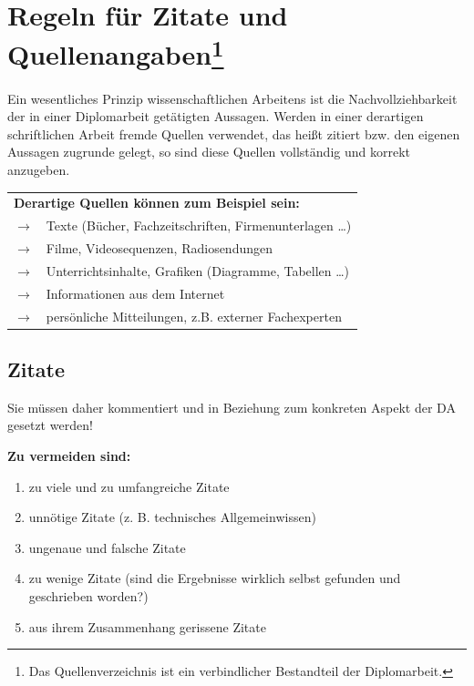 \documentclass[a4paper, 12pt, xcolor=dvipsnames]{scrartcl}		%
\begin{document}
\section{Regeln für Zitate und Quellenangaben\protect\footnote{Das Quellenverzeichnis ist ein verbindlicher Bestandteil der Diplomarbeit.}}
Ein wesentliches Prinzip wissenschaftlichen Arbeitens ist die Nachvollziehbarkeit der in einer Diplomarbeit
getätigten Aussagen. Werden in einer derartigen schriftlichen Arbeit fremde Quellen verwendet, das heißt zitiert bzw. den eigenen Aussagen zugrunde gelegt, so sind diese Quellen vollständig und korrekt anzugeben.\\

{\begin{tabular}{p{1.0cm}p{12.0cm}}
\multicolumn{2}{p{13.0cm}}{\textbf{Derartige Quellen können zum Beispiel sein:}} \\ 
\textcolor{black!80} {\large\textbf{$\to$}}  & Texte (Bücher, Fachzeitschriften, Firmenunterlagen \dots) \\ 
\textcolor{black!80} {\large\textbf{$\to$}}  & Filme, Videosequenzen, Radiosendungen \\
\textcolor{black!80} {\large\textbf{$\to$}}  & Unterrichtsinhalte, Grafiken (Diagramme, Tabellen \dots) \\
\textcolor{black!80} {\large\textbf{$\to$}}  & Informationen aus dem Internet \\
\textcolor{black!80} {\large\textbf{$\to$}}  & persönliche Mitteilungen, z.B. externer Fachexperten \\ 
\end{tabular}}
\vspace{0.5cm}
  

\subsection{Zitate}

%
\begin{Merksatz}
Sie müssen daher kommentiert und in Beziehung zum konkreten Aspekt der DA gesetzt
werden!
\end{Merksatz}
%

\textbf{Zu vermeiden sind:}
%
\begin{enumerate}
\linespread {1.0}%
\item zu viele und zu umfangreiche Zitate
\item unnötige Zitate (z. B. technisches Allgemeinwissen)
\item ungenaue und falsche Zitate
\item zu wenige Zitate (sind die Ergebnisse wirklich selbst gefunden und geschrieben worden?)
\item aus ihrem Zusammenhang gerissene Zitate
\linespread {1.25}%
\end{enumerate}
\end{document}

